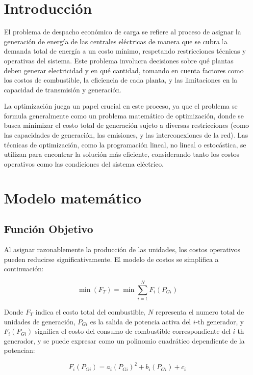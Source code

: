 \documentclass[11pt]{article}
\begin{document}
\section{Introducción}	
El problema de despacho económico de carga se refiere al proceso de asignar la generación de energía de las centrales eléctricas de manera que se cubra la demanda total de energía a un costo mínimo, respetando restricciones técnicas y operativas del sistema. Este problema involucra decisiones sobre qué plantas deben generar electricidad y en qué cantidad, tomando en cuenta factores como los costos de combustible, la eficiencia de cada planta, y las limitaciones en la capacidad de transmisión y generación.

La optimización juega un papel crucial en este proceso, ya que el problema se formula generalmente como un problema matemático de optimización, donde se busca minimizar el costo total de generación sujeto a diversas restricciones (como las capacidades de generación, las emisiones, y las interconexiones de la red). Las técnicas de optimización, como la programación lineal, no lineal o estocástica, se utilizan para encontrar la solución más eficiente, considerando tanto los costos operativos como las condiciones del sistema eléctrico.

\newpage
\section{Modelo matemático}
\subsection{Función Objetivo}

Al asignar razonablemente la producción de las unidades, los costos operativos pueden reducirse significativamente. 
El modelo de costos se simplifica a continuación:

\begin{equation}
    \min (F_T) =\min  \sum_{i=1}^{N} F_i(P_{Gi})
\end{equation}

Donde \( F_T \) indica el costo total del combustible, \( N \) representa el numero total de unidades de generación, 
\( P_{Gi} \) es la salida de potencia activa del \( i \)-th generador, y \( F_i(P_{Gi}) \) significa el costo del consumo 
de combustible correspondiente del \( i \)-th generador, y se puede expresar como un polinomio cuadrático dependiente de 
la potencian:

\begin{equation}
    F_i(P_{Gi}) = a_i(P_{Gi})^2 + b_i(P_{Gi}) + c_i
\end{equation}
\end{document}
